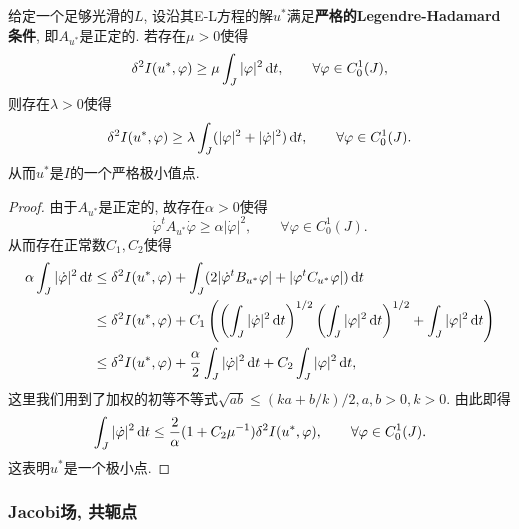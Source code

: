 \begin{proposition}[充分条件2]\label{prop1.14}
    给定一个足够光滑的$L$, 设沿其E-L方程的解$u^*$满足\textbf{严格的Legendre-Hadamard条件}, 即$A_{u^*}$是正定的.
    若存在$\mu > 0$使得 
    \begin{equation*}
        \delta^2I(u^*, \varphi) \geq \mu\int_J|\varphi|^2 \,{\rm d}t, \qquad \forall \varphi \in C_0^1(J),
    \end{equation*}
    则存在$\lambda > 0$使得
    \begin{equation*}
        \delta^2I(u^*, \varphi) \geq \lambda\int_J(|\varphi|^2+|\dot\varphi|^2) \,{\rm d}t, \qquad \forall \varphi \in C_0^1(J).
    \end{equation*}
    从而$u^*$是$I$的一个严格极小值点.
    \begin{proof}
        由于$A_{u^*}$是正定的, 故存在$\alpha > 0$使得 
        \begin{equation*}
            \dot\varphi^tA_{u^*}\dot\varphi \geq \alpha|\dot\varphi|^2, \qquad \forall \varphi \in C_0^1(J).
        \end{equation*}
        从而存在正常数$C_1, C_2$使得
        \begin{align*} 
            \alpha\int_J|\dot\varphi|^2 \,{\rm d}t &\leq \delta^2I(u^*,\varphi) + \int_J(2| \dot\varphi^tB_{u^*}\varphi| + |\varphi^t C_{u^*}\varphi|) \,{\rm d}t \\ 
            &\leq \delta^2I(u^*,\varphi) + C_1\left(\left(\int_J|\dot\varphi|^2 \,{\rm d}t\right)^{1/2}\left(\int_J|\varphi|^2 \,{\rm d}t\right)^{1/2} + \int_J|\varphi|^2 \,{\rm d}t\right) \\ 
            &\leq \delta^2I(u^*,\varphi) + \frac{\alpha}{2}\int_J|\dot\varphi|^2 \,{\rm d}t + C_2\int_J|\varphi|^2 \,{\rm d}t, 
        \end{align*}
        这里我们用到了加权的初等不等式$\sqrt{ab} \leq (ka + b/k)/2, a, b > 0, k > 0$.
        由此即得 
        \begin{equation*}
            \int_J|\dot\varphi|^2 \,{\rm d}t \leq \frac{2}{\alpha}(1+C_2\mu^{-1})\delta^2I(u^*, \varphi), \qquad \forall \varphi \in C_0^1(J).
        \end{equation*} 
        这表明$u^*$是一个极小点.
    \end{proof}
\end{proposition}

\subsubsection{Jacobi场, 共轭点}

